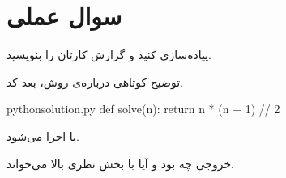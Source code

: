 \section{سوال عملی }

\begin{question}
    پیاده‌سازی کنید و گزارش کارتان را بنویسید.
\end{question}

\begin{answer}
    توضیح کوتاهی درباره‌ی روش، بعد کد.

    \begin{code}{python}{solution.py}
    def solve(n):
        return n * (n + 1) // 2
    \end{code}

    با  اجرا می‌شود.
\end{answer}

\begin{answer}[نتیجه]
    خروجی چه بود و آیا با بخش نظری بالا می‌خواند.

\end{answer}

